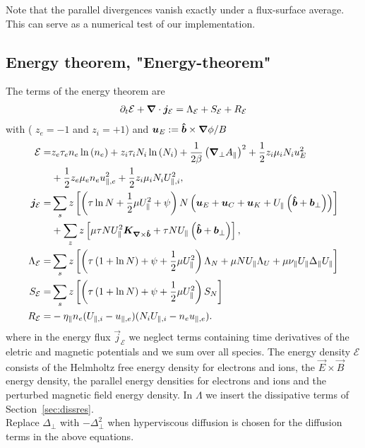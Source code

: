 Note that the parallel divergences vanish exactly under a flux-surface average. This can serve as a numerical test of our implementation.
\subsection{Energy theorem, "Energy-theorem"}
The terms of the energy theorem are
\begin{align} \label{eq:energy_theorem}
\partial_t \mathcal E +
{\boldsymbol{\nabla}}\cdot {\boldsymbol{j}}_{\mathcal E}
= \Lambda_{\mathcal E}
+  S_{\mathcal E}
+  R_{\mathcal E}
\end{align}
with ( $z_e=-1$ and $z_i=+1$) and ${\boldsymbol{u}}_E := {\bm{\hat{b}}\times {\boldsymbol{\nabla}}\phi}/{B}$
\begin{align} \label{eq:energy_conservation}
  \mathcal{E}= & z_e\tau_e n_e \ln{(n_e)} +z_i\tau_i N_i\ln{(N_i)}
  +\frac{1}{2\beta}\left({\boldsymbol{\nabla}}_{\perp} A_\parallel\right)^2
   +  \frac{1}{2} z_i \mu_i N_i u_E^2  \nonumber\\
   & +\frac{1}{2} z_e\mu_e  n_e u_{\parallel,e}^2
  +\frac{1}{2} z_i\mu_i  N_i U_{\parallel,i}^2,\\
  {\boldsymbol{j}}_{\mathcal E} =& \sum_s z\left[
  \left(\tau \ln N + \frac{1}{2}\mu U_\parallel^2 + \psi \right)N\left(
  {\boldsymbol{u}}_E + {\boldsymbol{u}}_C + {\boldsymbol{u}}_{K} +U_\parallel\left(\bm{\hat{b}}+{{\boldsymbol{b}}}_\perp\right)  \right) \right]
  \nonumber\\
  &+ \sum_z z\left[\mu \tau NU_\parallel^2{\boldsymbol{K}}_{{\boldsymbol{\nabla}}\times\bm{\hat{b}}} + \tau NU_\parallel \left(\bm{\hat{b}} + {{\boldsymbol{b}}}_\perp\right)\right], \\
  \Lambda_{\mathcal E} =&  \sum_s z\left[\left( \tau\left( 1+\ln{N}\right) + \psi + \frac{1}{2} \mu U_\parallel^2 \right)
  \Lambda_N  +  \mu NU_\parallel\Lambda_U + \mu \nu_\parallel U_\parallel \Delta_\parallel U_\parallel \right]
\nonumber \\
  S_{\mathcal E} =&  \sum_s  z\left[ \left(\tau\left( 1+\ln{N}\right) +\psi + \frac{1}{2} \mu U_\parallel^2 \right)S_{N}\right]
\nonumber \\
R_{\mathcal E} =&  -\eta_\parallel  n_e(U_{\parallel,i}-u_{\parallel,e})(N_iU_{\parallel,i} - n_eu_{\parallel,e}).
\end{align}
where in the energy flux $\vec j_{\mathcal E}$
we neglect terms  containing time derivatives
of the eletric and magnetic potentials and we sum over all species.
The energy density $\mathcal E$ consists of the Helmholtz free energy density for electrons and ions,
the \(\vec{E} \times \vec{B}\) energy density, the parallel energy densities for electrons and ions and the perturbed magnetic field energy density.
In \(\Lambda\) we insert the dissipative terms of Section~\ref{sec:dissres}. \\
Replace $\Delta_\perp$ with $-\Delta_\perp^2$ when hyperviscous diffusion is chosen
for the diffusion terms in the above equations.

